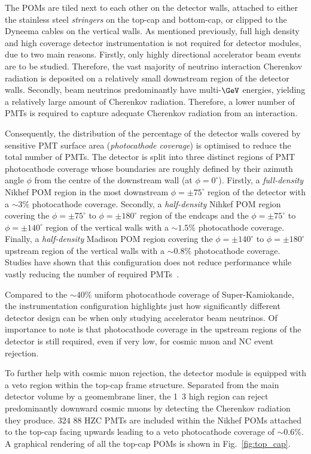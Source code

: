 The POMs are tiled next to each other on the detector walls, attached to either the stainless
steel \emph{stringers} on the top-cap and bottom-cap, or clipped to the Dyneema cables on the
vertical walls. As mentioned previously, full high density and high coverage detector
instrumentation is not required for \chips detector modules, due to two main reasons. Firstly,
only highly directional accelerator beam events are to be studied. Therefore, the vast majority of
neutrino interaction Cherenkov radiation is deposited on a relatively small downstream region of
the detector walls. Secondly, beam neutrinos predominantly have multi-$\GeV$ energies, yielding a
relatively large amount of Cherenkov radiation. Therefore, a lower number of PMTs is required to
capture adequate Cherenkov radiation from an interaction.

Consequently, the distribution of the percentage of the detector walls covered by sensitive PMT
surface area (\emph{photocathode coverage}) is optimised to reduce the total number of PMTs. The
detector is split into three distinct regions of PMT photocathode coverage whose boundaries are
roughly defined by their azimuth angle $\phi$ from the centre of the downstream wall (at
$\phi=0^{\circ}$). Firstly, a \emph{full-density} Nikhef POM region in the most downstream
$\phi=\pm75^{\circ}$ region of the detector with a $\sim3\%$ photocathode coverage. Secondly, a
\emph{half-density} Nihkef POM region covering the $\phi=\pm75^{\circ}$ to $\phi=\pm180^{\circ}$
region of the endcaps and the $\phi=\pm75^{\circ}$ to $\phi=\pm140^{\circ}$ region of the vertical
walls with a $\sim1.5\%$ photocathode coverage. Finally, a \emph{half-density} Madison POM region
covering the $\phi=\pm140^{\circ}$ to $\phi=\pm180^{\circ}$ upstream region of the vertical walls
with a $\sim0.8\%$ photocathode coverage. Studies have shown that this configuration does not
reduce performance while vastly reducing the number of required PMTs~\cite{blake2016}.

Compared to the $\sim40\%$ uniform photocathode coverage of Super-Kamiokande, the \chipsfive
instrumentation configuration highlights just how significantly different detector design can be
when only studying accelerator beam neutrinos. Of importance to note is that photocathode coverage
in the upstream regions of the detector is still required, even if very low, for cosmic muon and
NC event rejection.

To further help with cosmic muon rejection, the \chipsfive detector module is equipped with a veto
region within the top-cap frame structure. Separated from the main detector volume by a
geomembrane liner, the \unit{1.3}{} high region can reject predominantly downward cosmic
muons by detecting the Cherenkov radiation they produce. $324$ \unit{88}{} HZC PMTs are
included within the Nikhef POMs attached to the top-cap facing upwards leading to a veto
photocathode coverage of $\sim0.6\%$. A graphical rendering of all the top-cap POMs is shown in
Fig.~\ref{fig:top_cap}.

